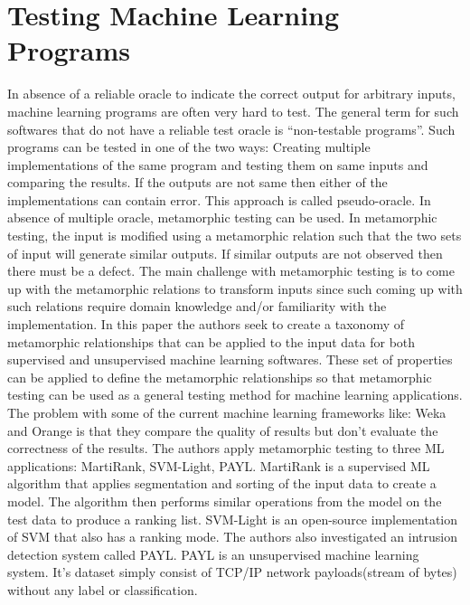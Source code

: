 \section{Testing Machine Learning Programs}
In absence of a reliable oracle to indicate the correct output for arbitrary inputs, machine learning programs are often very hard to test. The general term for such softwares that do not have a reliable test oracle is “non-testable programs”. Such programs can be tested in one of the two ways:
Creating multiple implementations of the same program and testing them on same inputs and comparing the results. If the outputs are not same then either of the implementations can contain error. This approach is called pseudo-oracle.
In absence of multiple oracle, metamorphic testing can be used. In metamorphic testing, the input is modified using a metamorphic relation such that the two sets of input will generate similar outputs. If similar outputs are not observed then there must be a defect.
The main challenge with metamorphic testing is to come up with the metamorphic relations to transform inputs since such coming up with such relations require domain knowledge and/or familiarity with the implementation.
In this paper the authors seek to create a taxonomy of metamorphic relationships that can be applied to the input data for both supervised and unsupervised machine learning softwares. These set of properties can be applied to define the metamorphic relationships so that metamorphic testing can be used as a general testing method for machine learning applications. The problem with some of the current machine learning frameworks like: Weka and Orange is that they compare the quality of results but don’t evaluate the correctness of the results. The authors apply metamorphic testing to three ML applications: MartiRank, SVM-Light, PAYL.
MartiRank is a supervised ML algorithm that applies segmentation and sorting of the input data to create a model. The algorithm then performs similar operations from the model on the test data to produce a ranking list. SVM-Light is an open-source implementation of SVM that also has a ranking mode. The authors also investigated an intrusion detection system called PAYL. PAYL is an unsupervised machine learning system. It’s dataset simply consist of TCP/IP network payloads(stream of bytes) without any label or classification.
